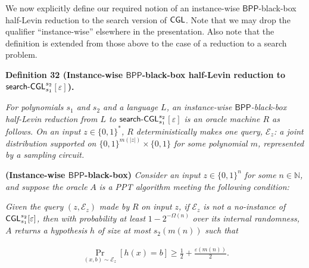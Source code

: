 


We now explicitly define our required notion of an instance-wise ${\mathsf{BPP}}$-black-box half-Levin reduction to the search version of ${\sf CGL}$. Note that we may drop the qualifier “instance-wise” elsewhere in the presentation. Also note that the definition is extended from those above to the case of a reduction to a search problem.\par





\par\medskip\noindent\textbf{
\textbf{Definition 32}\textbf{ }(Instance-wise ${\mathsf{BPP}}$-black-box half-Levin reduction to ${\sf search}\text{-}{\sf CGL}_{s_{1}}^{s_{2}}$$[\varepsilon]$)\textbf{.}
}\par



\emph{For polynomials $s_{1}$ and $s_{2}$ and a language $L$, an instance-wise ${\mathsf{BPP}}$-black-box half-Levin reduction from $L$ to ${\sf search}\text{-}{\sf CGL}_{s_{1}}^{s_{2}}$$[\varepsilon]$ is an oracle machine $R$ as follows. On an input $z\in\{0,1\}^{*}$, $R$ deterministically makes one query, $\mathcal{E}_{z}$: a joint distribution supported on $\{0,1\}^{m(|z|)}\times\{0,1\}$ for some polynomial $m$, represented by a sampling circuit.}\par




\textbf{(Instance-wise ${\mathsf{BPP}}$-black-box)}\emph{
Consider an input }$z\in\{0,1\}^{n}$\emph{ for some }$n\in\mathbb{N}$\emph{, and suppose the oracle }$A$\emph{ is a PPT algorithm meeting the following condition:}\par



\emph{Given the query }$(z,\mathcal{E}_{z})$\emph{ made by }$R$\emph{ on input }$z$\emph{, if }$\mathcal{E}_{z}$\emph{ is not a no-instance of }${\sf CGL}_{s_{1}}^{s_{2}}[\varepsilon]$\emph{, then with probability at least }$1-2^{-\Omega(n)}$\emph{ over its internal randomness, }$A$\emph{ returns a hypothesis }$h$\emph{ of size at most }$s_{2}(m(n))$\emph{ such that}\par


\[\begin{gathered}
\Pr_{(x,b)\sim\mathcal{E}_{z}}[h(x)=b]\geq\frac{1}{2}+\frac{\varepsilon(m(n))}{2}.
\end{gathered}\]



